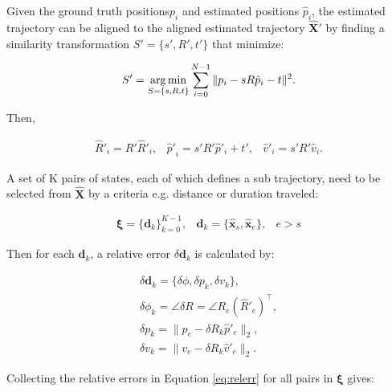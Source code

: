 \begin{inparaenum}[Step 1.]
	\item Given the ground truth positions$ {{{p}_i}} $ and estimated positions ${{\hat{p}}_i}$, the estimated trajectory can be aligned to the aligned estimated trajectory $\bm{\hat{X}}'$ by finding a similarity transformation $S'=\{s', {R}', {t}'\}$ that minimize:
	
	\begin{equation}
	S'=\operatorname*{arg\,min}_{S=\{s, R, t\}}{\sum_{i=0}^{N-1}{\|{p}_i-sR{\hat{p}_i}-t\|^{2}}}.
	\end{equation}
	
	Then,
	
	\begin{equation}
	\begin{array}{lll}
		\hat{R}'_i=R'\hat{R}'_i,&  {\hat{p}'}_i=s'R'\hat{{p}}'_i+t',  & \hat{v}'_i=s'R'\hat{v}_i.
	\end{array}
	\end{equation}
	
	\item A set of K pairs of states, each of which defines a sub trajectory, need to be selected from $\hat{\bm{X}}$ by a criteria e.g. distance or duration traveled:
	
	\begin{equation}
	\begin{array}{lll}
	\bm{\xi}=\{\bm{d}_k\}_{k=0}^{K-1}, & \bm{d}_k=\{\bm{\hat{x}}_s, \bm{\hat{x}}_e\}, & e>s
	\end{array}
	\end{equation}
	
	\item Then for each $\bm{d}_k$, a relative error $\delta{\bm{d}_k}$  is calculated by:
	
	\begin{equation}
	\begin{array}{l}
	\delta{\bm{d}_k}=\{\delta{\phi}, \delta{p_k}, \delta{v_k}\}, \\
	\delta\phi_k=\angle \delta R=\angle R_e(\hat{R}'_e)^\top, \\
	\delta{p_k}=\|{p_e-\delta R_k\hat{p}'_e}\|_2, \\
	\delta{v_k}=\|v_e-\delta R_k \hat{v}'_e\|_2.
	\end{array}
	\label{eq:relerr}
	\end{equation}
	
	\item Collecting the relative errors in Equation \ref{eq:relerr} for all pairs in $\bm{\xi}$ gives:
	

\end{inparaenum}
